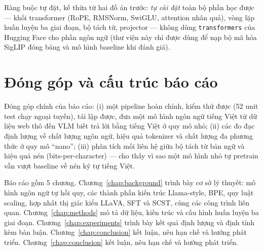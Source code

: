Ràng buộc tự đặt, kế thừa từ hai đồ án trước: \emph{tự cài đặt} toàn bộ phần
học được --- khối transformer (RoPE, RMSNorm, SwiGLU, attention nhân quả),
vòng lặp huấn luyện ba giai đoạn, bộ tách từ, projector --- không dùng
\texttt{transformers} của Hugging Face cho phần ngôn ngữ (thư viện này chỉ được
dùng để nạp bộ mã hóa SigLIP đóng băng và mô hình baseline khi đánh giá).

\section{Đóng góp và cấu trúc báo cáo}

Đóng góp chính của báo cáo: (i) một pipeline hoàn chỉnh, kiểm thử được
(52 unit test chạy ngoại tuyến), tái lập được, đưa một mô hình ngôn ngữ tiếng
Việt từ dữ liệu web thô đến VLM biết trả lời bằng tiếng Việt ở quy mô nhỏ;
(ii) các đo đạc định lượng về chất lượng ngôn ngữ, hiệu quả tokenizer và chất
lượng đa phương thức ở quy mô ``nano''; (iii) phân tích mối liên hệ giữa bộ
tách từ bản ngữ và hiệu quả nén (bits-per-character) --- cho thấy vì sao một
mô hình nhỏ tự pretrain vẫn vượt baseline về nén ký tự tiếng Việt.

Báo cáo gồm 5 chương. Chương~\ref{chap:background} trình bày cơ sở lý thuyết:
mô hình ngôn ngữ tự hồi quy, các thành phần kiến trúc Llama-style, BPE, quy
luật scaling, hợp nhất thị giác kiểu LLaVA, SFT và SCST, cùng các công trình
liên quan. Chương~\ref{chap:methods} mô tả dữ liệu, kiến trúc và cấu hình
huấn luyện ba giai đoạn. Chương~\ref{chap:experiments} trình bày kết quả định
lượng và định tính kèm bàn luận. Chương~\ref{chap:conclusion} kết luận, nêu
hạn chế và hướng phát triển.
Chương~\ref{chap:conclusion} kết luận, nêu hạn chế và hướng phát triển.
